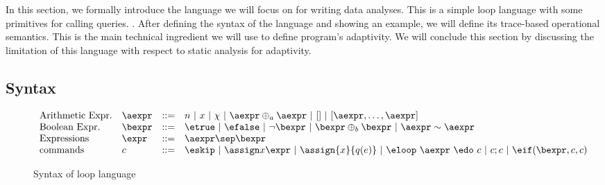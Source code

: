 In this section, we formally introduce the language we will focus on for writing data analyses.  This is a simple loop language with some primitives for calling queries. . After defining the syntax of the language and showing an example, we will define its trace-based operational semantics. This is the main technical ingredient we will use to define program's adaptivity. We will conclude this section by discussing the limitation of this language with respect to static analysis for adaptivity.

\subsection{Syntax}
\label{subsec:loop-syntax}
\begin{figure}
\[
\begin{array}{llll}
\mbox{Arithmetic Expr.} & \aexpr & ::= & 
	n ~|~ x ~|~ \chi ~|~ \aexpr \oplus_a \aexpr ~|~ [] ~|~ [\aexpr, \dots, \aexpr] \\
\mbox{Boolean Expr.} & \bexpr & ::= & 
	\etrue ~|~ \efalse  ~|~ \neg \bexpr
	 ~|~ \bexpr \oplus_b \bexpr
	~|~ \aexpr \sim \aexpr \\
\mbox{Expressions} & \expr & ::= & \aexpr \sep \bexpr \\	
\mbox{commands} & c & ::= &  \eskip  ~|~  \assign x \expr ~|~  \assign{x}{ q(e)}
%
~|~ \eloop ~ \aexpr  ~ \edo ~ c  ~|~ c;c  ~|~ \eif(\bexpr, c, c) 	 
	\\
%
\end{array}
\]
 \caption{Syntax of loop language}
    \label{fig:syntax_highlevel}
\end{figure}

